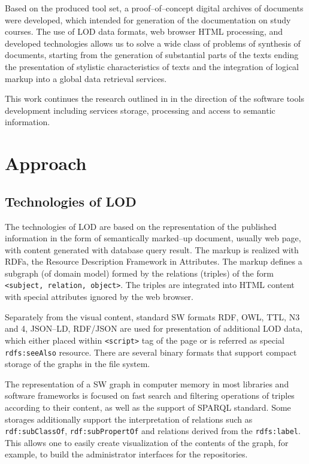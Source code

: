 \documentclass[conference,a4paper]{IEEEtran}
\begin{document}
Based on the produced tool set, a proof--of--concept digital archives of documents were developed, which intended for generation of the documentation on study courses.  The use of LOD data formats, web browser HTML processing, and developed technologies allows us to solve a wide class of problems of synthesis of documents, starting from the generation of substantial parts of the texts ending the presentation of stylistic characteristics of texts and the integration of logical markup into a global data retrieval services.

This work continues the research outlined in \cite{b2} in the direction of the software tools development including services storage, processing and access to semantic information.

\section{Approach}
\subsection{Technologies of LOD}

The technologies of LOD are based on the representation of the published information in the form of semantically marked--up document, usually web page, with content generated with database query result.  The markup is realized with RDFa, the Resource Description Framework in Attributes.  The markup defines a subgraph (of domain model) formed by the relations (triples) of the form \texttt{<subject, relation, object>}.  The triples are integrated into HTML content with special attributes ignored by the web browser.

Separately from the visual content, standard SW formats RDF, OWL, TTL, N3 and 4, JSON--LD, RDF/JSON are used for presentation of additional LOD data, which either placed within \texttt{<script>} tag of the page or is referred as special \texttt{rdfs:seeAlso} resource.  There are several binary formats that support compact storage of the graphs in the file system.

The representation of a SW graph in computer memory in most libraries and software frameworks is focused on fast search and filtering operations of triples according to their content, as well as the support of SPARQL standard.  Some storages additionally support the interpretation of relations such as \texttt{rdf:subClassOf}, \texttt{rdf:subPropertOf} and relations derived from the \texttt{rdfs:label}.  This allows one to easily create visualization of the contents of the graph, for example, to build the administrator interfaces for the repositories.
\end{document}
